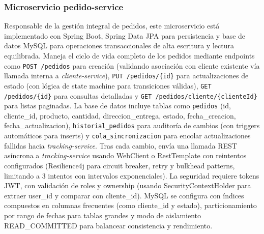 \documentclass[a4paper,12pt]{article}
\begin{document}
\subsubsection{Microservicio pedido-service}
Responsable de la gestión integral de pedidos, este microservicio está implementado con Spring Boot, Spring Data JPA para persistencia y base de datos MySQL para operaciones transaccionales de alta escritura y lectura equilibrada. Maneja el ciclo de vida completo de los pedidos mediante endpoints como \texttt{POST /pedidos} para creación (validando asociación con cliente existente vía llamada interna a \textit{cliente-service}), \texttt{PUT /pedidos/\{id\}} para actualizaciones de estado (con lógica de state machine para transiciones válidas), \texttt{GET /pedidos/\{id\}} para consultas detalladas y \texttt{GET /pedidos/cliente/\{clienteId\}} para listas paginadas. La base de datos incluye tablas como \texttt{pedidos} (id, cliente\_id, producto, cantidad, direccion\_entrega, estado, fecha\_creacion, fecha\_actualizacion), \texttt{historial\_pedidos} para auditoría de cambios (con triggers automáticos para inserts) y \texttt{cola\_sincronizacion} para encolar actualizaciones fallidas hacia \textit{tracking-service}. Tras cada cambio, envía una llamada REST asíncrona a \textit{tracking-service} usando WebClient o RestTemplate con reintentos configurados (Resilience4j para circuit breaker, retry y bulkhead patterns, limitando a 3 intentos con intervalos exponenciales). La seguridad requiere tokens JWT, con validación de roles y ownership (usando SecurityContextHolder para extraer user\_id y comparar con cliente\_id). MySQL se configura con índices compuestos en columnas frecuentes (como cliente\_id y estado), particionamiento por rango de fechas para tablas grandes y modo de aislamiento READ\_COMMITTED para balancear consistencia y rendimiento.
\end{document}
